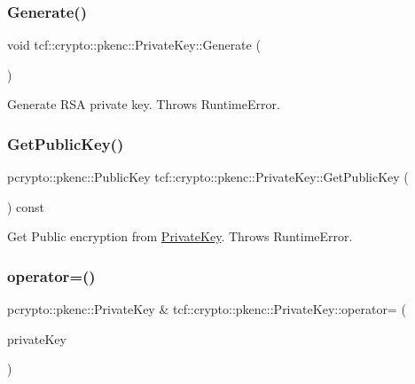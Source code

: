 \subsubsection{\texorpdfstring{Generate()}{Generate()}}
{\footnotesize\ttfamily void tcf\+::crypto\+::pkenc\+::\+Private\+Key\+::\+Generate (\begin{DoxyParamCaption}{ }\end{DoxyParamCaption})}

Generate R\+SA private key. Throws Runtime\+Error. \mbox{\label{classtcf_1_1crypto_1_1pkenc_1_1PrivateKey_ad15aaa6b8d4e656304502a60526bbfa3}} 
\subsubsection{\texorpdfstring{Get\+Public\+Key()}{GetPublicKey()}}
{\footnotesize\ttfamily pcrypto\+::pkenc\+::\+Public\+Key tcf\+::crypto\+::pkenc\+::\+Private\+Key\+::\+Get\+Public\+Key (\begin{DoxyParamCaption}{ }\end{DoxyParamCaption}) const}

Get Public encryption from \hyperlink{classtcf_1_1crypto_1_1pkenc_1_1PrivateKey}{Private\+Key}. Throws Runtime\+Error. \mbox{\label{classtcf_1_1crypto_1_1pkenc_1_1PrivateKey_a7c2477079f7f65622ddba491a6fa5a32}} 
\subsubsection{\texorpdfstring{operator=()}{operator=()}}
{\footnotesize\ttfamily pcrypto\+::pkenc\+::\+Private\+Key \& tcf\+::crypto\+::pkenc\+::\+Private\+Key\+::operator= (\begin{DoxyParamCaption}\item[{const \hyperlink{classtcf_1_1crypto_1_1pkenc_1_1PrivateKey}{Private\+Key} \&}]{private\+Key }\end{DoxyParamCaption})}

